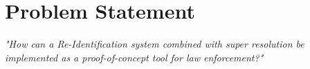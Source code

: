 \chapter{Problem Statement} \label{cha: probstate}

\textit{"How can a Re-Identification system combined with super resolution be implemented as a proof-of-concept tool for law enforcement?"}